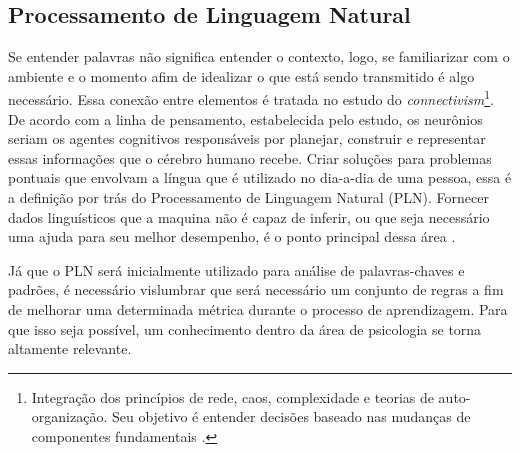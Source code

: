 \subsection{Processamento de Linguagem Natural}
Se entender palavras não significa entender o contexto, logo, se familiarizar com o ambiente e o momento afim de idealizar o que está sendo transmitido é algo necessário. Essa conexão entre elementos é tratada no estudo do \textit{connectivism}\footnote{Integração dos princípios de rede, caos, complexidade e teorias de auto-organização. Seu objetivo é entender decisões baseado nas mudanças de componentes fundamentais \cite{siemens2014connectivism}.}. De acordo com a linha de pensamento, estabelecida pelo estudo, os neurônios seriam os agentes cognitivos responsáveis por planejar, construir e representar essas informações que o cérebro humano recebe. Criar soluções para problemas pontuais que envolvam a língua que é utilizado no dia-a-dia de uma pessoa, essa é a definição por trás do Processamento de Linguagem Natural (PLN). Fornecer dados linguísticos que a maquina não é capaz de inferir, ou que seja necessário uma ajuda para seu melhor desempenho, é o ponto principal dessa área \cite{brandura1996, maria2015npl}.

Já que o PLN será inicialmente utilizado para análise de palavras-chaves e padrões, é necessário vislumbrar que será necessário um conjunto de regras a fim de melhorar uma determinada métrica durante o processo de aprendizagem. Para que isso seja possível, um conhecimento dentro da área de psicologia se torna altamente relevante.
